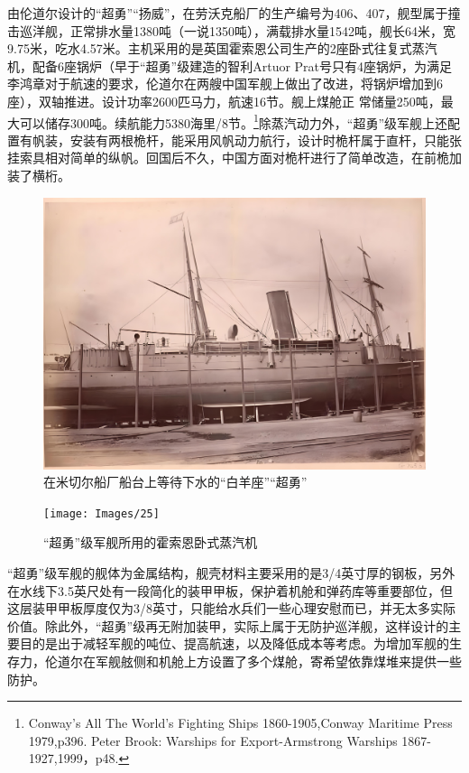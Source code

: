 \documentclass[12pt,UTF8]{ctexbook}
\begin{document}
由伦道尔设计的“超勇”“扬威”，在劳沃克船厂的生产编号为406、407，舰型属于撞击巡洋舰，正常排水量1380吨（一说1350吨），满载排水量1542吨，舰长64米，宽9.75米，吃水4.57米。主机采用的是英国霍索恩公司生产的2座卧式往复式蒸汽机，配备6座锅炉（早于“超勇”级建造的智利Artuor Prat号只有4座锅炉，为满足李鸿章对于航速的要求，伦道尔在两艘中国军舰上做出了改进，将锅炉增加到6座），双轴推进。设计功率2600匹马力，航速16节。舰上煤舱正
常储量250吨，最大可以储存300吨。续航能力5380海里/8节。\footnote{Conway's All The World's Fighting Ships 1860-1905,Conway Maritime Press 1979,p396. Peter Brook: Warships for Export-Armstrong  Warships 1867-1927,1999，p48.}除蒸汽动力外，“超勇”级军舰上还配置有帆装，安装有两根桅杆，能采用风帆动力航行，设计时桅杆属于直杆，只能张挂索具相对简单的纵帆。回国后不久，中国方面对桅杆进行了简单改造，在前桅加装了横桁。

\begin{figure}[htbp]
	\centering
	\includegraphics[width=1\linewidth]{Images/24}
	\caption{在米切尔船厂船台上等待下水的“白羊座”“超勇”}
	\label{fig:1}
\end{figure}

\begin{figure}[htbp]
	\centering
	\texttt{[image: Images/25]}
	\caption{“超勇”级军舰所用的霍索恩卧式蒸汽机}
	\label{fig:1}
\end{figure}

“超勇”级军舰的舰体为金属结构，舰壳材料主要采用的是3/4英寸厚的钢板，另外在水线下3.5英尺处有一段简化的装甲甲板，保护着机舱和弹药库等重要部位，但这层装甲甲板厚度仅为3/8英寸，只能给水兵们一些心理安慰而已，并无太多实际价值。除此外，“超勇”级再无附加装甲，实际上属于无防护巡洋舰，这样设计的主要目的是出于减轻军舰的吨位、提高航速，以及降低成本等考虑。为增加军舰的生存力，伦道尔在军舰舷侧和机舱上方设置了多个煤舱，寄希望依靠煤堆来提供一些防护。
\end{document}

